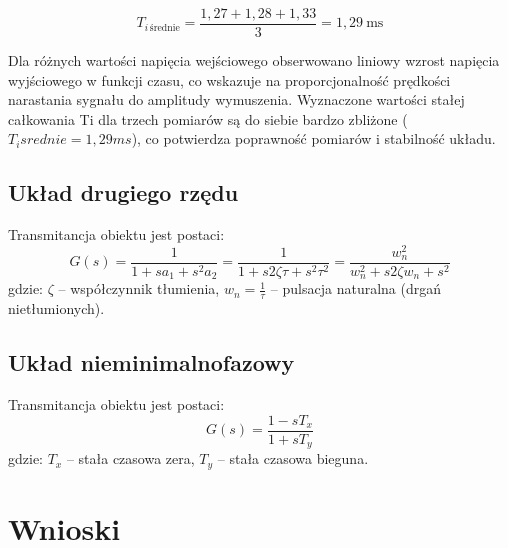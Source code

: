 \documentclass[12pt,a4paper]{article}
\begin{document}
	\[
	T_{i\,\text{średnie}} = \frac{1,27 + 1,28 + 1,33}{3} = 1,29\ \text{ms}
	\]
	
	Dla różnych wartości napięcia wejściowego obserwowano liniowy wzrost napięcia wyjściowego w funkcji czasu, co wskazuje na proporcjonalność prędkości narastania sygnału do amplitudy wymuszenia. Wyznaczone wartości stałej całkowania Ti dla trzech pomiarów są do siebie bardzo zbliżone ($T_isrednie = 1,29 ms$), co potwierdza poprawność pomiarów i stabilność układu.
	
	
	\subsection{Układ drugiego rzędu}
	Transmitancja obiektu jest postaci:
	\begin{equation}
		G(s) = \frac{1}{1 + sa_1 + s^2a_2}
		= \frac{1}{1+s 2\zeta \tau + s^2 \tau^2}
		= \frac{w_n^2}{w_n^2 + s 2 \zeta w_n + s^2}
	\end{equation}
	gdzie: \(\zeta\) – współczynnik tłumienia, \(w_n = \frac{1}{\tau}\) – pulsacja naturalna (drgań nietłumionych).
	
	\subsection{Układ nieminimalnofazowy}
	Transmitancja obiektu jest postaci:
	\begin{equation}
		G(s) = \frac{1-sT_x}{1+sT_y}
	\end{equation}
	gdzie: \(T_x\) – stała czasowa zera, \(T_y\) – stała czasowa bieguna.
	
	\section{Wnioski}
	
\end{document}
